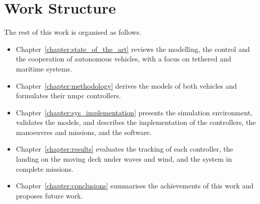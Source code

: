 
\section{Work Structure}
\label{sec:intro_structure}

The rest of this work is organised as follows.
\begin{itemize}
    \item Chapter~\ref{chapter:state_of_the_art} reviews the modelling, the control and the cooperation of autonomous vehicles, with a focus on tethered and maritime systems.
    \item Chapter~\ref{chapter:methodology} derives the models of both vehicles and formulates their \gls{nmpc} controllers.
    \item Chapter~\ref{chapter:sys_implementation} presents the simulation environment, validates the models, and describes the implementation of the controllers, the manoeuvres and missions, and the software.
    \item Chapter~\ref{chapter:results} evaluates the tracking of each controller, the landing on the moving deck under waves and wind, and the system in complete missions.
    \item Chapter~\ref{chapter:conclusions} summarises the achievements of this work and proposes future work.
\end{itemize}
